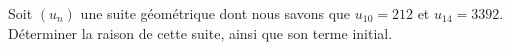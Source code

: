 
\begin{exercice}\label{exosmath-0305}

    Soit \( (u_n)\) une suite géométrique dont nous savons que \( u_{10}=212\) et \( u_{14}=3392\). Déterminer la raison de cette suite, ainsi que son terme initial.

\end{exercice}
